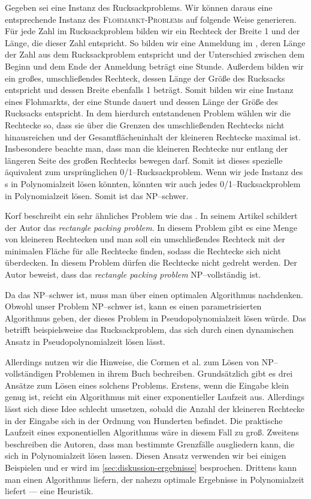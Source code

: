 Gegeben sei eine Instanz des Rucksackproblems.
Wir können daraus eine entsprechende Instanz des \textsc{Floh\-markt-\-Pro\-blem}s auf folgende Weise generieren.
Für jede Zahl im Rucksackproblem bilden wir ein Rechteck der Breite 1 und der Länge, die 
dieser Zahl entspricht.
So bilden wir eine Anmeldung im \fp{}, deren Länge der
Zahl aus dem Rucksackproblem entspricht und der Unterschied zwischen
dem Beginn und dem Ende der Anmeldung beträgt eine Stunde.
Außerdem bilden wir ein großes, umschließendes Rechteck, dessen Länge der Größe des Rucksacks entspricht
und dessen Breite ebenfalls 1 beträgt.
Somit bilden wir eine Instanz eines Flohmarkts, der eine Stunde dauert und dessen 
Länge der Größe des Rucksacks entspricht.
In dem hierdurch entstandenen Problem wählen wir die Rechtecke so, 
dass sie über die Grenzen des umschließenden Rechtecks nicht hinausreichen
und der Gesamtflächeninhalt der kleineren Rechtecke maximal ist. 
Insbesondere beachte man, dass man die kleineren Rechtecke nur entlang der längeren
Seite des großen Rechtecks bewegen darf.
Somit ist dieses spezielle \fp{} äquivalent zum ursprünglichen 0/1--Rucksackproblem.
Wenn wir jede Instanz des \fp s in Polynomialzeit lösen könnten,
könnten wir auch jedes 0/1--Rucksackproblem in Polynomialzeit lösen.
Somit ist das \fp{} NP--schwer.

Korf beschreibt ein sehr ähnliches Problem wie das \fp.\cite{korf} 
In seinem Artikel schildert der Autor das \textit{rectangle packing problem}.
In diesem Problem gibt es eine Menge von kleineren Rechtecken und man soll
ein umschließendes Rechteck mit der minimalen Fläche für alle Rechtecke finden,
sodass die Rechtecke sich nicht überdecken.
In diesem Problem dürfen die Rechtecke nicht gedreht werden.
Der Autor beweist, dass das \textit{rectangle packing problem} NP--vollständig ist.

Da das \fp{} NP--schwer ist, muss man über einen optimalen Algorithmus nachdenken. 
Obwohl unser Problem NP--schwer ist, kann es einen parametrisierten Algorithmus geben,
der dieses Problem in Pseudopolynomialzeit lösen würde.
Das betrifft beispielsweise das Rucksackproblem, das sich durch einen dynamischen 
Ansatz in Pseudopolynomialzeit lösen lässt.\cite{parametrized}

Allerdings nutzen wir die Hinweise, die Cormen et al. zum Lösen von NP--vollständigen Problemen
in ihrem Buch bechreiben. Grundsätzlich gibt es drei Ansätze zum Lösen eines
solchens Problems.\cite[S.~1106]{cormen}
Erstens, wenn die Eingabe klein genug ist, reicht ein 
Algorithmus mit einer exponentieller Laufzeit aus.
Allerdings lässt sich diese Idee schlecht umsetzen,
sobald die Anzahl der kleineren Rechtecke in der Eingabe sich in der Ordnung von Hunderten befindet.
Die praktische Laufzeit eines exponentiellen Algorithmus wäre in diesem Fall zu groß.
Zweitens beschreiben die Autoren,
dass man bestimmte Grenzfälle ausgliedern kann, die sich in Polynomialzeit lösen lassen.
Diesen Ansatz verwenden wir bei einigen Beispielen und er wird im \cref{sec:diskussion-ergebnisse}
besprochen.
Drittens kann man einen Algorithmus liefern, der nahezu optimale Ergebnisse 
in Polynomialzeit liefert --- eine Heuristik. 


